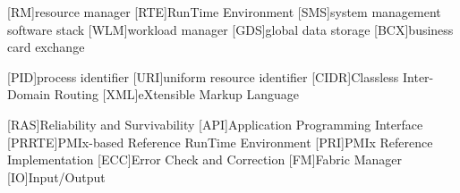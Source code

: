 [RM]{resource manager}
[RTE]{RunTime Environment}
[SMS]{system management software stack}
[WLM]{workload manager}
[GDS]{global data storage}
[BCX]{business card exchange}

[PID]{process identifier}
[URI]{uniform resource identifier}
[CIDR]{Classless Inter-Domain Routing}
[XML]{eXtensible Markup Language}

[RAS]{Reliability and Survivability}
[API]{Application Programming Interface}
[PRRTE]{PMIx-based Reference RunTime Environment}
[PRI]{PMIx Reference Implementation}
[ECC]{Error Check and Correction}
[FM]{Fabric Manager}
[IO]{Input/Output}




%
%
    

%
%
    \setcounter{page}{0}
    \setcounter{tocdepth}{2}

    \begin{spacing}{1.3}
        \tableofcontents
    \end{spacing}

%
%
    \linenumbers\pagewiselinenumbers
    \newpage{}
    \setcounter{chapter}{0}  %

%
%
    

    

    

    

    

